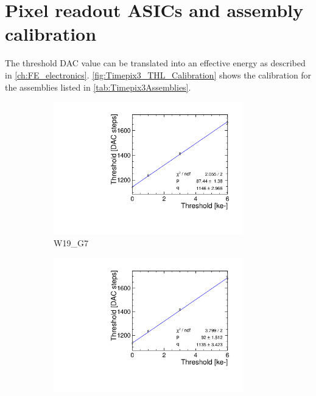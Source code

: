 \chapter{Pixel readout ASICs and assembly calibration}
\label{sec:appendixFE_electronics}

The threshold DAC value can be translated into an effective energy as
described in
\cref{ch:FE_electronics}. \cref{fig:Timepix3_THL_Calibration} shows
the calibration for the assemblies listed in
\cref{tab:Timepix3Assemblies}.

\begin{figure}[htbp] \centering
  \begin{subfigure}[b]{0.45\textwidth}
    \includegraphics[width=0.9\textwidth]{./figures/Calibration/THLcalibration_W0019_G07.pdf}
    \caption{W19\_G7}
  \end{subfigure} \hfill
  \begin{subfigure}[b]{0.45\textwidth}
    \includegraphics[width=0.9\textwidth]{./figures/Calibration/THLcalibration_W0019_F07.pdf}

\end{subfigure}
\end{figure}
